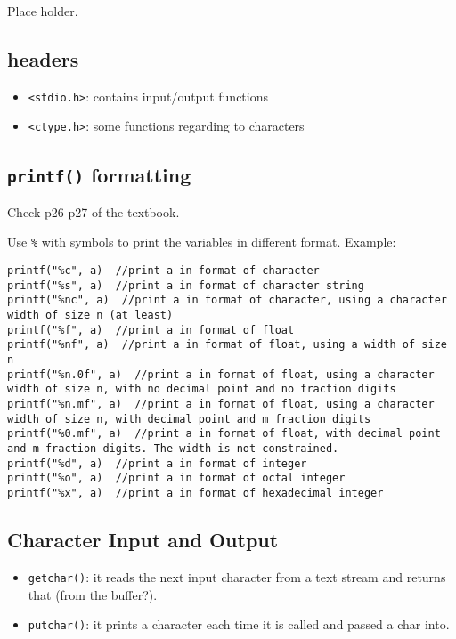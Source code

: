 \documentclass[11pt]{article}
\begin{document}
Place holder.

\subsection{headers}
\label{sec:orgbb69648}
\begin{itemize}
\item \texttt{<stdio.h>}: contains input/output functions
\item \texttt{<ctype.h>}: some functions regarding to characters
\end{itemize}

\subsection{\texttt{printf()} formatting}
\label{sec:orgcee48ea}
Check p26-p27 of the textbook.

Use \texttt{\%} with symbols to print the variables in different format.
Example:
\begin{verbatim}
printf("%c", a)  //print a in format of character
printf("%s", a)  //print a in format of character string
printf("%nc", a)  //print a in format of character, using a character width of size n (at least)
printf("%f", a)  //print a in format of float
printf("%nf", a)  //print a in format of float, using a width of size n
printf("%n.0f", a)  //print a in format of float, using a character width of size n, with no decimal point and no fraction digits
printf("%n.mf", a)  //print a in format of float, using a character width of size n, with decimal point and m fraction digits
printf("%0.mf", a)  //print a in format of float, with decimal point and m fraction digits. The width is not constrained.
printf("%d", a)  //print a in format of integer
printf("%o", a)  //print a in format of octal integer
printf("%x", a)  //print a in format of hexadecimal integer
\end{verbatim}
\subsection{Character Input and Output}
\label{sec:org278a282}
\begin{itemize}
\item \texttt{getchar()}: it reads the next input character from a text stream and returns that (from the buffer?).
\item \texttt{putchar()}: it prints a character each time it is called and passed a char into.
\end{itemize}
\end{document}
